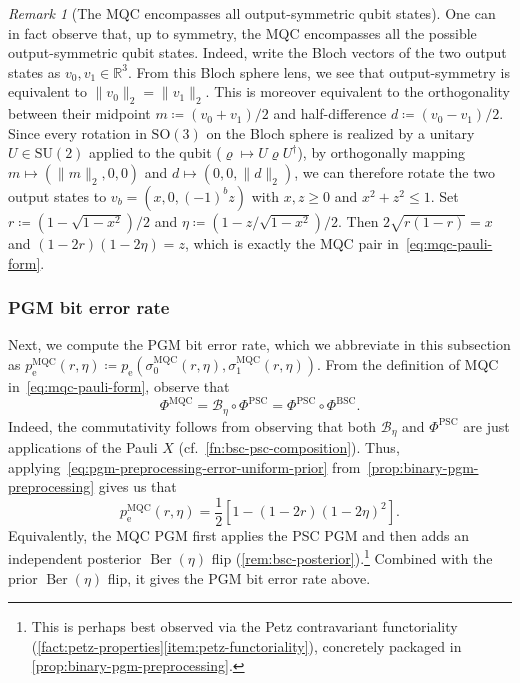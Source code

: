 \documentclass[11pt]{article}
\renewcommand{\leq}{\leqslant}
\renewcommand{\geq}{\geqslant}
\theoremstyle{remark}
\newtheorem{remark}{Remark}[section]
\newcommand{\Ber}{\operatorname{Ber}}
\newcommand{\norm}[1]{\lVert#1\rVert}
\newcommand{\BSC}{\mathrm{BSC}}
\newcommand{\PSC}{\mathrm{PSC}}
\newcommand{\MQC}{\mathrm{MQC}}
\begin{document}
\begin{remark}[The MQC encompasses all output-symmetric qubit states]
\label{rem:mqc-has-all-qubits}
One can in fact observe that, up to symmetry, the MQC encompasses all the possible output-symmetric qubit states. Indeed, write the Bloch vectors of the two output states as $v_0,v_1 \in \mathbb{R}^3$. From this Bloch sphere lens, we see that output-symmetry is equivalent to $\norm{v_0}_2 = \norm{v_1}_2$. This is moreover equivalent to the orthogonality between their midpoint $m \coloneqq (v_0+v_1)/2$ and half-difference $d \coloneqq (v_0-v_1)/2$. Since every rotation in $\text{SO}(3)$ on the Bloch sphere is realized by a unitary $U \in \text{SU}(2)$ applied to the qubit ($\varrho \mapsto U\varrho U^\dagger$), by orthogonally mapping $m \mapsto (\norm{m}_2,0,0)$ and $d \mapsto (0,0,\norm{d}_2)$, we can therefore rotate the two output states to $v_b=(x,0,(-1)^bz)$ with $x,z \geq 0$ and $x^2+z^2 \leq 1$. Set $r \coloneqq (1-\sqrt{1-x^2})/2$ and $\eta \coloneqq (1-z/\sqrt{1-x^2})/2$. Then $2\sqrt{r(1-r)}=x$ and $(1-2r)(1-2\eta)=z$, which is exactly the MQC pair in~\eqref{eq:mqc-pauli-form}.
\end{remark}

\subsubsection{PGM bit error rate}
\label{subsubsec:mqc-pgm-error}

Next, we compute the PGM bit error rate, which we abbreviate in this subsection as $p_{\mathrm{e}}^{\MQC}(r,\eta) \coloneqq p_{\mathrm{e}}(\sigma_0^{\MQC}(r,\eta),\sigma_1^{\MQC}(r,\eta))$. From the definition of MQC in~\eqref{eq:mqc-pauli-form}, observe that
\begin{equation*}
    \Phi^{\MQC} = \mathcal{B}_\eta \circ \Phi^{\PSC} = \Phi^{\PSC} \circ \Phi^{\BSC}.
\end{equation*}
Indeed, the commutativity follows from observing that both $\mathcal{B}_\eta$ and $\Phi^{\PSC}$ are just applications of the Pauli $X$ (cf.~\cref{fn:bsc-psc-composition}). Thus, applying~\eqref{eq:pgm-preprocessing-error-uniform-prior} from~\cref{prop:binary-pgm-preprocessing} gives us that
\begin{equation}
\label{eq:mqc-pgm-error-formula}
p_{\mathrm{e}}^{\MQC}(r,\eta) = \frac{1}{2}\left[1-(1-2r)(1-2\eta)^2\right].
\end{equation}
Equivalently, the MQC PGM first applies the PSC PGM and then adds an independent posterior $\Ber(\eta)$ flip (\cref{rem:bsc-posterior}).\footnote{This is perhaps best observed via the Petz contravariant functoriality (\cref{fact:petz-properties}\ref{item:petz-functoriality}), concretely packaged in \cref{prop:binary-pgm-preprocessing}.} Combined with the prior $\Ber(\eta)$ flip, it gives the PGM bit error rate above.
\end{document}
